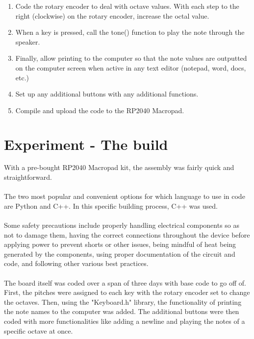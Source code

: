 \documentclass{article}
\begin{document}
\begin{enumerate}
    \item Code the rotary encoder to deal with octave values. With each step to the right (clockwise) on the rotary encoder, increase the octal value.
    
    \item When a key is pressed, call the tone() function to play the note through the speaker. 

    \item Finally, allow printing to the computer so that the note values are outputted on the computer screen when active in any text editor (notepad, word, docs, etc.)

    \item Set up any additional buttons with any additional functions. 

    \item Compile and upload the code to the RP2040 Macropad. 
        
   
\end{enumerate}

\section{Experiment - The build}

\hspace{1cm} With a pre-bought RP2040 Macropad kit, the assembly was fairly quick and straightforward. \\\\

The two most popular and convenient options for which language to use in code are Python and C++. In this specific building process, C++ was used.\\\\

Some safety precautions include properly handling electrical components so as not to damage them, having the correct connections throughout the device before applying power to prevent shorts or other issues, being mindful of heat being generated by the components, using proper documentation of the circuit and code, and following other various best practices.\\\\ 

The board itself was coded over a span of three days with base code to go off of. First, the pitches were assigned to each key with the rotary encoder set to change the octaves. Then, using the "Keyboard.h" library, the functionality of printing the note names to the computer was added. The additional buttons were then coded with more functionalities like adding a newline and playing the notes of a specific octave at once. \\\\
\end{document}
